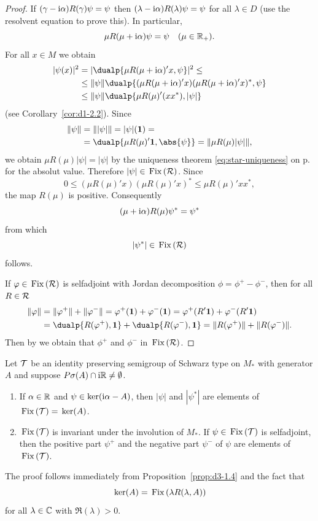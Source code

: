 \begin{proof}
If\/ $(\gamma - \mathrm{i}\alpha)R(\gamma)\psi = \psi$ then $(\lambda - \mathrm{i}\alpha)R(\lambda)\psi = \psi$ for all $\lambda \in D$ (use the resolvent equation to prove this).
In particular, 
\[
\mu R(\mu + \mathrm{i}\alpha)\psi = \psi \quad (\mu \in \mathbb{R}_{+}).
\]
For all $x \in M$ we obtain
\begin{align*}
|\psi(x)|^2 &= | \dualp{\mu R(\mu+\im\alpha)'x,\psi} |^2 \leq \\
&\leq \|\psi\| \dualp{(\mu R(\mu+\im\alpha)'x)(\mu R(\mu+\im\alpha)'x)^{*},\psi}  \\
&\leq \|\psi\| \dualp{\mu R(\mu)'(xx^{*}),|\psi|}
\end{align*}
(see Corollary~\ref{cor:d1-2.2}).
Since
\begin{align*}
\|\psi\| &= \| |\psi| \| = |\psi|(\1) = \\
&= \dualp{\mu R(\mu)'\1,\abs{\psi}} = \| \mu R(\mu)|\psi| \|,
\end{align*}
we obtain $\mu R(\mu)|\psi| = |\psi|$ by the uniqueness theorem \eqref{eq:star-uniqueness} on p.~\pageref{eq:star-uniqueness} for the absolut value.
Therefore $|\psi| \in \mathop{}\mathrm{Fix}\left(\mathcal{R}\right) $.
Since
\[
0 \leq (\mu R(\mu)'x)(\mu R(\mu)'x)^{*} \leq \mu R(\mu)'xx^{*},
\]
the map $R(\mu)$ is positive.
Consequently 
\[
(\mu+\mathrm{i}\alpha)R(\mu)\psi^{*} = \psi^{*}
\]
from which 
\[
|\psi^{*}| \in \mathop{}\mathrm{Fix}\left(\mathcal{R}\right) 
\]
follows.

If\/ $\phi \in \Fix{\RR} $ is selfadjoint with Jordan decomposition $\phi = \phi^{+} - \phi^{-}$, then for all $ R \in \mathcal{R} $
\begin{align*}
\| \phi \| &= \| \phi^{+} \| + \| \phi^{-} \|  =
    \phi^{+}(\1) + \phi^{-}(\1) = \phi^{+}(R'\1) + \phi^{-}(R'\1) \\
    &= \dualp{R(\phi^{+}), \1}  + \dualp{R(\phi^{-}), \1}   =
    \| R(\phi^{+}) \| + \| R(\phi^{-}) \| .
\end{align*}
Then by \textcite[Theorem III.4.2.]{takesaki:1979} we obtain that $\phi^{+}$ and $\phi^{-}$ in $ \mathop{}\mathrm{Fix}\left(\mathcal{R}\right) $.
\end{proof}
\begin{corollary}\label{cor:d3-1.5}
Let $\mathcal{T}$ be an identity preserving semigroup of Schwarz type on $M_{*}$ with generator $A$ and suppose $P\sigma(A) \cap \mathrm{i}\mathbb{R} \neq \emptyset$.
\begin{enumerate}[\upshape (i)]
\item
If\/ $\alpha \in \mathbb{R}$ and $\psi \in \operatorname{ker}(\mathrm{i}\alpha - A)$, then $|\psi|$ and $|\psi^{*}|$ are elements of\/ $\mathop{}\mathrm{Fix}\left(\mathcal{T}\right) = \mathop{}\mathrm{ker}(A)$.

\item 
$\mathop{}\mathrm{Fix}\left(\mathcal{T}\right)$ is invariant under the involution of\/ $M_{*}$.
If\/ $\psi \in \mathop{}\mathrm{Fix}\left(\mathcal{T}\right)$ is selfadjoint, then the positive part $\psi^{+}$ and the negative part $\psi^{-}$ of\/ $\psi$ are elements of\/ $\mathop{}\mathrm{Fix}\left(\mathcal{T}\right)$.
\end{enumerate}
\end{corollary}
The proof follows immediately from Proposition~\ref{prop:d3-1.4} and the fact that 
\[ 
\mathop{}\mathrm{ker}(A) = \mathop{}\mathrm{Fix}\left(\lambda R(\lambda,A)\right)
\]
for all $\lambda \in \mathbb{C}$ with $\Re(\lambda) > 0$.

